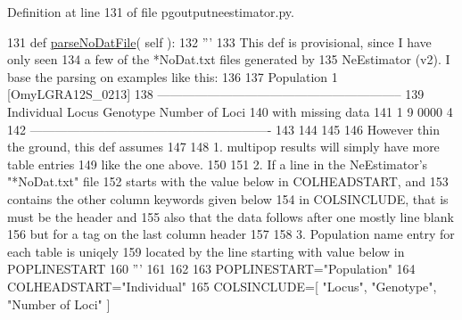 Definition at line 131 of file pgoutputneestimator.\+py.


\begin{DoxyCode}
131     \textcolor{keyword}{def }\hyperlink{classnegui_1_1pgoutputneestimator_1_1PGOutputNeEstimator_a4f8192c2aacf6e38b2c4c1d80302b643}{parseNoDatFile}( self ):
132         \textcolor{stringliteral}{'''}
133 \textcolor{stringliteral}{        This def is provisional, since I have only seen}
134 \textcolor{stringliteral}{        a few of the *NoDat.txt files generated by}
135 \textcolor{stringliteral}{        NeEstimator (v2). I base the parsing on examples like this:}
136 \textcolor{stringliteral}{}
137 \textcolor{stringliteral}{        Population 1 [OmyLGRA12S\_0213]  }
138 \textcolor{stringliteral}{        -----------------------------------------------------------}
139 \textcolor{stringliteral}{        Individual       Locus         Genotype     Number of Loci}
140 \textcolor{stringliteral}{                                          with missing data}
141 \textcolor{stringliteral}{               1            9             0000             4   }
142 \textcolor{stringliteral}{        ----------------------------------------------------------  }
143 \textcolor{stringliteral}{        }
144 \textcolor{stringliteral}{    }
145 \textcolor{stringliteral}{        }
146 \textcolor{stringliteral}{        However thin the ground, this def assumes}
147 \textcolor{stringliteral}{}
148 \textcolor{stringliteral}{        1. multipop results will simply have more table entries}
149 \textcolor{stringliteral}{        like the one above.}
150 \textcolor{stringliteral}{}
151 \textcolor{stringliteral}{        2. If a line in the NeEstimator's "*NoDat.txt" file}
152 \textcolor{stringliteral}{        starts with the value below in COLHEADSTART, and }
153 \textcolor{stringliteral}{        contains the other column keywords given below}
154 \textcolor{stringliteral}{        in COLSINCLUDE, that is must be the header and}
155 \textcolor{stringliteral}{        also that the data follows after one mostly line blank}
156 \textcolor{stringliteral}{        but for a tag on the last column header}
157 \textcolor{stringliteral}{}
158 \textcolor{stringliteral}{        3. Population name entry for each table is uniqely}
159 \textcolor{stringliteral}{        located by the line starting with value below in POPLINESTART}
160 \textcolor{stringliteral}{        '''}
161 
162 
163         POPLINESTART=\textcolor{stringliteral}{"Population"}
164         COLHEADSTART=\textcolor{stringliteral}{"Individual"}       
165         COLSINCLUDE=[ \textcolor{stringliteral}{"Locus"}, \textcolor{stringliteral}{"Genotype"}, \textcolor{stringliteral}{"Number of Loci"} ]

\end{DoxyCode}
